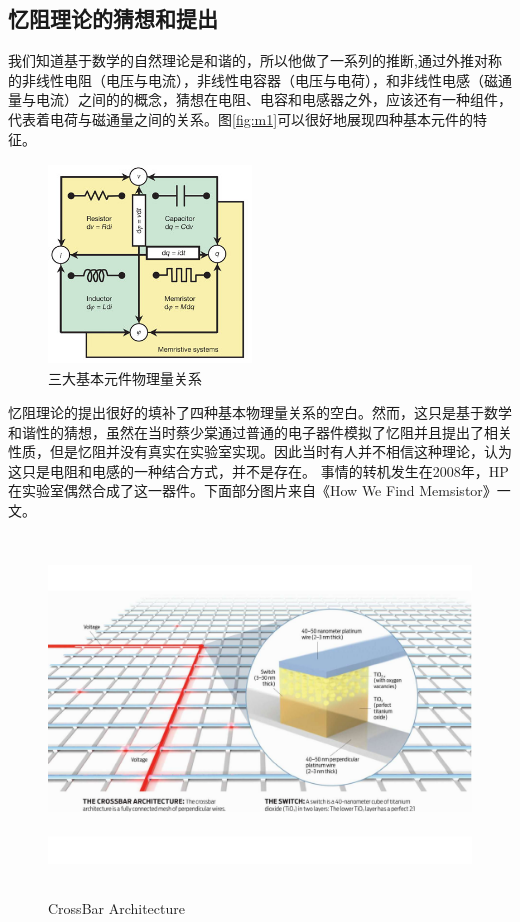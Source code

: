 \documentclass[UTF8]{article}
\begin{document}
\subsection{忆阻理论的猜想和提出}
我们知道基于数学的自然理论是和谐的，所以他做了一系列的推断,通过外推对称的非线性电阻（电压与电流），非线性电容器（电压与电荷），和非线性电感（磁通量与电流）之间的的概念，猜想在电阻、电容和电感器之外，应该还有一种组件，代表着电荷与磁通量之间的关系。图\eqref{fig:m1}可以很好地展现四种基本元件的特征。
\begin{figure}[htbp]
\centering
\includegraphics[width=2.12in,height=2.1in]{pic/memristor01.jpeg}
\caption{三大基本元件物理量关系}
\label{fig:m1}
\end{figure}
忆阻理论的提出很好的填补了四种基本物理量关系的空白。然而，这只是基于数学和谐性的猜想，虽然在当时蔡少棠通过普通的电子器件模拟了忆阻并且提出了相关性质，但是忆阻并没有真实在实验室实现。因此当时有人并不相信这种理论，认为这只是电阻和电感的一种结合方式，并不是存在。
事情的转机发生在2008年，HP在实验室偶然合成了这一器件。下面部分图片来自《How We Find Memsistor》一文。

\begin{figure}[htbp]
\centering
\includegraphics[width=5.77in,height=3.75in]{pic/71}
\caption{CrossBar Architecture}
\label{fig:71}
\end{figure}
\end{document}

